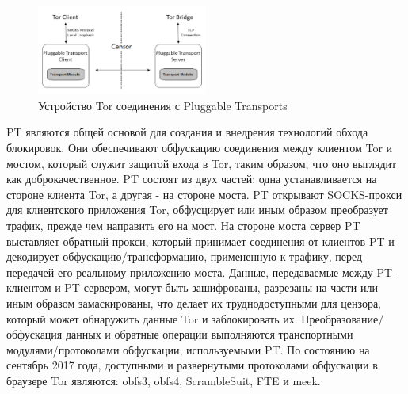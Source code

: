 \begin{figure}[h!]
    \begin{center}
        \includegraphics[width = 0.5\textwidth]{tor_pt.png}
        \caption{Устройство Tor соединения с Pluggable Transports}
    \end{center}
\end{figure}

PT являются общей основой для создания и внедрения технологий обхода блокировок.
Они обеспечивают обфускацию соединения между клиентом Tor и мостом, который служит защитой входа в Tor,
таким образом, что оно выглядит как доброкачественное.
PT состоят из двух частей: одна устанавливается на стороне клиента Tor, а другая - на стороне моста.
PT открывают SOCKS-прокси для клиентского приложения Tor, обфусцирует или иным образом преобразует трафик, прежде чем направить его на мост.
На стороне моста сервер PT выставляет обратный прокси, который принимает соединения от клиентов PT и декодирует обфускацию/трансформацию,
примененную к трафику, перед передачей его реальному приложению моста.
Данные, передаваемые между PT-клиентом и PT-сервером, могут быть зашифрованы, разрезаны на части или иным образом замаскированы,
что делает их труднодоступными для цензора, который может обнаружить данные Tor и заблокировать их.
Преобразование/обфускация данных и обратные операции выполняются транспортными модулями/протоколами обфускации, используемыми PT.
По состоянию на сентябрь 2017 года, доступными и развернутыми протоколами обфускации в браузере Tor являются: obfs3, obfs4, ScrambleSuit, FTE и meek.

